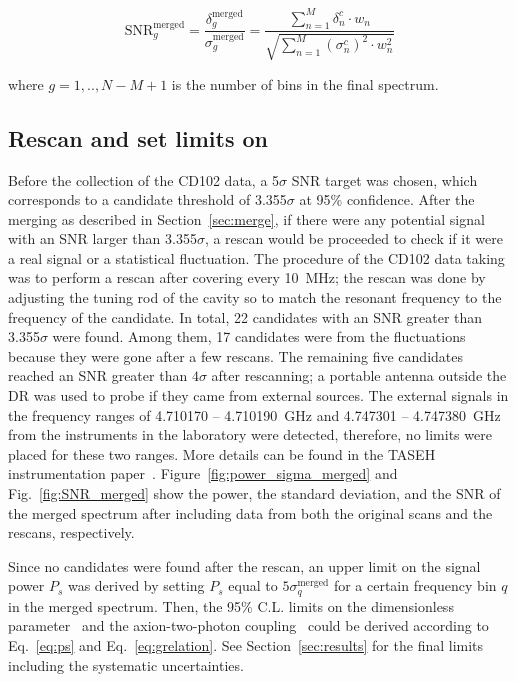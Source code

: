 \begin{equation}
    \label{eq:merged_snr}
    \text{SNR}_{g}^\text{merged} = \frac{\delta^\text{merged}_{g}}{\sigma^\text{merged}_{g}} = \frac{\sum_{n = 1}^{M}\delta_{n}^{c} \cdot {w_{n}}}{ \sqrt{\sum_{n = 1}^{M} (\sigma_{n}^{c})^2 \cdot {w_{n}^2}}}
\end{equation}

where $g = 1,..,N-M+1$ is the number of bins in the final spectrum.




\subsection{Rescan and set limits on \gagg} 
Before the collection of the CD102 data, a 5$\sigma$ SNR target was chosen, 
which corresponds to a candidate threshold of 3.355$\sigma$ at 95\% confidence.
 After the merging as described in Section~\ref{sec:merge}, if there were 
any potential signal with an SNR larger than 
3.355$\sigma$, a rescan would be proceeded to check if it were a real signal 
or a statistical fluctuation. 
The procedure of the CD102 data taking was to perform a rescan after 
covering every 10~MHz; the rescan was done by adjusting the tuning rod of the 
cavity so to match the resonant frequency to the frequency of the candidate. 
In total, 22 candidates with an SNR greater than 3.355$\sigma$ were found. 
Among them, 17 candidates were from the fluctuations because they were gone 
after a few rescans. 
The remaining five candidates reached an SNR greater than $4\sigma$ after 
rescanning; a 
portable antenna outside the DR was used to probe if they came from external 
sources. 
The external signals in the frequency ranges of 4.710170 -- 4.710190~GHz and 
4.747301 -- 4.747380~GHz from the instruments in the laboratory were detected, 
therefore, no limits were placed for these two ranges.  
More details can be found in the 
TASEH instrumentation paper~\cite{TASEHInstrumentation}. 
Figure~\ref{fig:power_sigma_merged} and Fig.~\ref{fig:SNR_merged} show the 
power, the standard deviation, and the SNR of the merged spectrum after 
including data from both the original scans and the rescans, respectively. 

Since no candidates were found after the rescan, an upper limit on 
the signal power $P_s$ was derived by setting $P_s$ equal to 
$5\sigma_{q}^\text{merged}$ for a certain frequency bin $q$ in the merged 
spectrum.  Then, the 95\% C.L. limits on the dimensionless parameter 
\ggamma\ and the axion-two-photon coupling \gagg\ could be derived 
according to Eq.~\eqref{eq:ps} and Eq.~\eqref{eq:grelation}. 
See Section~\ref{sec:results} for the final limits including the systematic 
uncertainties.

